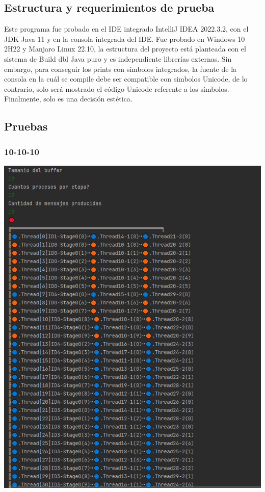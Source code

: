 \documentclass[a4paper]{article}
\begin{document}
    \subsection{Estructura y requerimientos de prueba}
    Este programa fue probado en el IDE integrado IntelliJ IDEA 2022.3.2, con el JDK Java 11 y en la consola integrada del IDE.
    Fue probado en Windows 10 2H22 y Manjaro Linux 22.10, la estructura del proyecto est\'a planteada con el sistema de Build dbl Java puro y es independiente librer\'ias externas.
    Sin embargo, para conseguir los prints con s\'imbolos integrados, la fuente de la consola en la cu\'al se compile debe ser compatible con simbolos Unicode,
    de lo contrario, solo ser\'a mostrado el c\'odigo Unicode referente a los s\'imbolos.
    Finalmente, solo es una decisi\'on est\'etica.

    \subsection{Pruebas}

    \subsubsection{10-10-10}
    \includegraphics{10-10-10.PNG}
\end{document}
